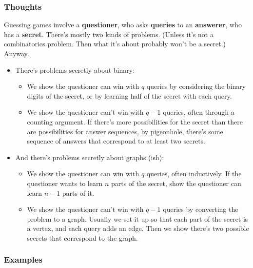 \documentclass[11pt,paper=letter]{scrartcl}
\begin{document}
\subsubsection*{Thoughts}

Guessing games involve a \textbf{questioner}, who asks \textbf{queries} to an \textbf{answerer}, who has a \textbf{secret}. There's mostly two kinds of problems. (Unless it's not a combinatorics problem. Then what it's about probably won't be a secret.) Anyway.

\begin{itemize}
\item There's problems secretly about binary:
\begin{itemize}
\item We show the questioner can win with $q$ queries by considering the binary digits of the secret, or by learning half of the secret with each query.
\item We show the questioner can't win with $q - 1$ queries, often through a counting argument. If there's more possibilities for the secret than there are possibilities for answer sequences, by pigeonhole, there's some sequence of answers that correspond to at least two secrets.
\end{itemize}

\item And there's problems secretly about graphs (ish):
\begin{itemize}
\item We show the questioner can win with $q$ queries, often inductively. If the questioner wants to learn $n$ parts of the secret, show the questioner can learn $n - 1$ parts of it.
\item We show the questioner can't win with $q - 1$ queries by converting the problem to a graph. Usually we set it up so that each part of the secret is a vertex, and each query adds an edge. Then we show there's two possible secrets that correspond to the graph.
\end{itemize}
\end{itemize}

\subsubsection*{Examples}
\end{document}
